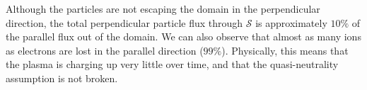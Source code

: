 Although the particles are not escaping the domain in the perpendicular direction, the total perpendicular particle flux through $\mathcal{S}$
is approximately $10\%$ of the parallel flux out of the domain.
We can also observe that almost as many ions as electrons are lost in the parallel direction ($99\%$).
Physically, this means that the plasma is charging up very little over time, and that the quasi-neutrality assumption is not broken.
